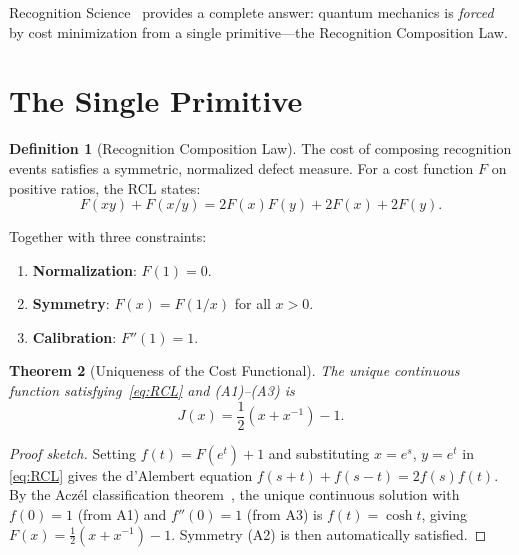 \documentclass[12pt,a4paper]{article}
\newtheorem{theorem}{Theorem}[section]
\theoremstyle{definition}
\newtheorem{definition}[theorem]{Definition}
\theoremstyle{remark}
\begin{document}
Recognition Science~\cite{RS_Axioms} provides a complete answer:
quantum mechanics is \emph{forced} by cost minimization from a single
primitive---the Recognition Composition Law.

\section{The Single Primitive}
\label{sec:primitive}

\begin{definition}[Recognition Composition Law]
The cost of composing recognition events satisfies a symmetric,
normalized defect measure.  For a cost function $F$ on positive ratios,
the RCL states:
\begin{equation}
  F(xy) + F(x/y) = 2F(x)F(y) + 2F(x) + 2F(y).
  \label{eq:RCL}
\end{equation}
\end{definition}

Together with three constraints:
\begin{enumerate}[label=(A\arabic*)]
  \item \textbf{Normalization}: $F(1) = 0$.
  \item \textbf{Symmetry}: $F(x) = F(1/x)$ for all $x > 0$.
  \item \textbf{Calibration}: $F''(1) = 1$.
\end{enumerate}

\begin{theorem}[Uniqueness of the Cost Functional]
\label{thm:unique-J}
The unique continuous function satisfying~\eqref{eq:RCL} and (A1)--(A3) is
\begin{equation}
  J(x) = \frac{1}{2}\left(x + x^{-1}\right) - 1.
\end{equation}
\end{theorem}

\begin{proof}[Proof sketch]
Setting $f(t) = F(e^t) + 1$ and substituting $x = e^s$, $y = e^t$ in
\eqref{eq:RCL} gives the d'Alembert equation
$f(s+t) + f(s-t) = 2f(s)f(t)$.  By the Acz\'el classification
theorem~\cite{Aczel1966}, the unique continuous solution with $f(0) = 1$
(from A1) and $f''(0) = 1$ (from A3) is $f(t) = \cosh t$, giving
$F(x) = \tfrac{1}{2}(x + x^{-1}) - 1$.  Symmetry (A2) is then
automatically satisfied.
\end{proof}

\end{document}
